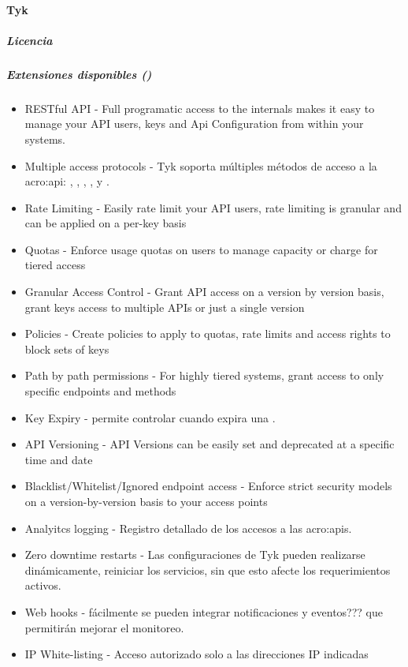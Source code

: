 \paragraph{Tyk}
\label{soa:tecnologias:tyk}

\subparagraph{Licencia}


\subparagraph{Extensiones disponibles ()}

\begin{itemize}
  \item RESTful API - Full programatic access to the internals makes it easy to manage your API users, keys and Api Configuration from within your systems.
  \item Multiple access protocols - Tyk soporta múltiples métodos de acceso a la \gls{acro:api}: , , , ,  y .
  \item Rate Limiting - Easily rate limit your API users, rate limiting is granular and can be applied on a per-key basis
  \item Quotas - Enforce usage quotas on users to manage capacity or charge for tiered access
  \item Granular Access Control - Grant API access on a version by version basis, grant keys access to multiple APIs or just a single version
  \item Policies - Create policies to apply to quotas, rate limits and access rights to block sets of keys
  \item Path by path permissions - For highly tiered systems, grant access to only specific endpoints and methods
  \item Key Expiry - permite controlar cuando expira una .
  \item API Versioning - API Versions can be easily set and deprecated at a specific time and date
  \item Blacklist/Whitelist/Ignored endpoint access - Enforce strict security models on a version-by-version basis to your access points
  \item Analyitcs logging - Registro detallado de los accesos a las \glspl{acro:api}.
  \item Zero downtime restarts - Las configuraciones de Tyk pueden realizarse dinámicamente, reiniciar los servicios, sin que esto afecte los requerimientos activos.
  \item Web hooks - fácilmente se pueden integrar notificaciones y eventos??? que permitirán mejorar el monitoreo.
  \item IP White-listing - Acceso autorizado solo a las direcciones IP indicadas

\end{itemize}
